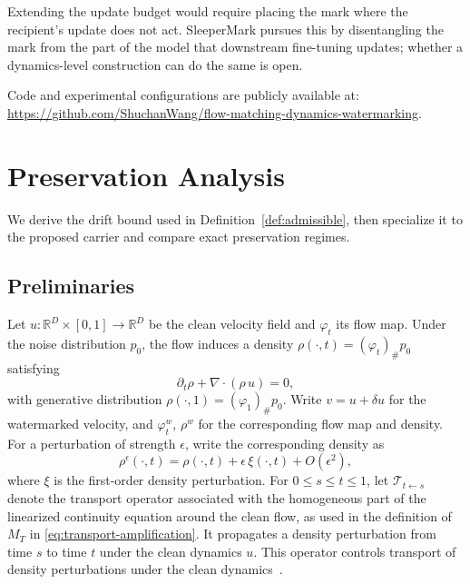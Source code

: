 \documentclass[11pt]{article}
\newcommand{\R}{\mathbb{R}}
\begin{document}
Extending the update budget would require placing the mark where the
recipient's update does not act. SleeperMark pursues this by
disentangling the mark from the part of the model that downstream
fine-tuning updates; whether a dynamics-level construction can do the
same is open.

Code and experimental configurations are publicly available at:
\url{https://github.com/ShuchanWang/flow-matching-dynamics-watermarking}.

\printbibliography

\appendix
\section{Preservation Analysis}
\label{app:preservation}

We derive the drift bound used in Definition~\ref{def:admissible}, then
specialize it to the proposed carrier and compare exact preservation regimes.

\subsection{Preliminaries}

Let $u : \R^D \times [0,1] \to \R^D$ be the clean velocity field and
$\varphi_t$ its flow map. Under the noise distribution $p_0$, the flow
induces a density $\rho(\cdot, t) = (\varphi_t)_\# p_0$ satisfying
\begin{equation}
\partial_t \rho + \nabla\!\cdot\!(\rho\,u) = 0,
\label{eq:ce-clean}
\end{equation}
with generative distribution $\rho(\cdot, 1) = (\varphi_1)_\# p_0$.
Write $v = u + \delta u$ for the watermarked velocity, and
$\varphi_t^w$, $\rho^w$ for the corresponding flow map and density.
For a perturbation of strength $\epsilon$, write the corresponding
density as
\begin{equation}
\rho^\epsilon(\cdot,t)
=\rho(\cdot,t)+\epsilon\,\xi(\cdot,t)+O(\epsilon^2),
\label{eq:density-expansion}
\end{equation}
where $\xi$ is the first-order density perturbation. For $0\le s\le t\le 1$, let $\mathcal{T}_{t\leftarrow s}$ denote the
transport operator associated with the homogeneous part of the
linearized continuity equation around the clean flow, as used in the
definition of $M_T$ in \eqref{eq:transport-amplification}. It
propagates a density perturbation from time $s$ to time $t$ under the
clean dynamics $u$. This operator controls transport of density perturbations
under the clean dynamics~\cite{diperna1989ordinary,ambrosio2004transport}.
\end{document}
